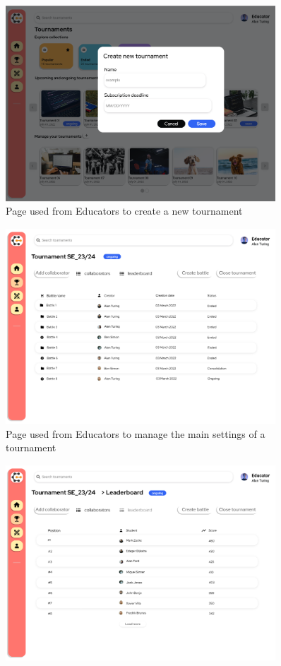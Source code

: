 \begin{enumerate}[label=\textbf{F\arabic*)}]
\begin{figure}[H]
        \includegraphics[width=0.9\textwidth]{Mockups/6_educator_create_tournament.png}
        \caption{Page used from Educators to create a new tournament}
    \end{figure}
    \begin{figure}[H]
        \centering
        \includegraphics[width=0.9\textwidth]{Mockups/7_educator_manages_tournament.png}
        \caption{Page used from Educators to manage the main settings of a tournament}
    \end{figure}
    \begin{figure}[H]
        \centering
        \includegraphics[width=0.9\textwidth]{Mockups/8_educator_tournament_leaderboard.png}

\end{figure}
\end{enumerate}
